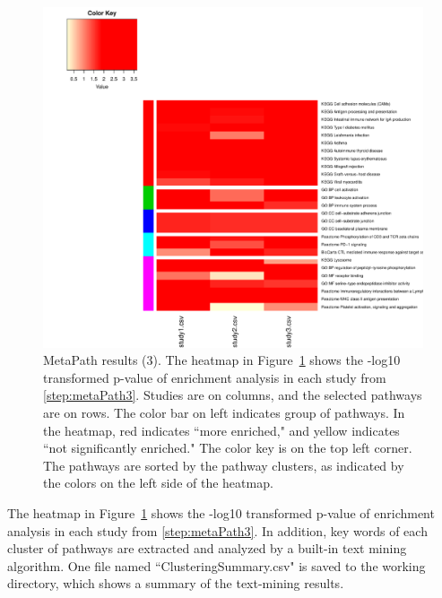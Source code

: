 \begin{figure}[H]
\begin{center}
\includegraphics[scale=0.6]{./figure/metaPath/Heatmap_clusters_all.pdf}
\caption{MetaPath results (3).
The heatmap in Figure~\ref{fig:MetaPathresult3} shows the -log10 transformed p-value of enrichment analysis in each study from \ref{step:metaPath3}. 
Studies are on columns, 
and the selected pathways are on rows. 
The color bar on left indicates group of pathways.
In the heatmap, red indicates ``more enriched," 
and yellow  indicates ``not significantly enriched." 
The color key is on the top left corner. 
The pathways are sorted by the pathway clusters, 
as indicated by the colors on the left side of the heatmap.}
\label{fig:MetaPathresult3}
\end{center}
\end{figure}


The heatmap in Figure~\ref{fig:MetaPathresult3} shows the -log10 transformed p-value of enrichment analysis in each study from \ref{step:metaPath3}. 
In addition, 
key words of each cluster of pathways are extracted and analyzed by a built-in text mining algorithm. 
One file named ``Clustering\textunderscore Summary.csv" is saved to the working directory, 
which shows a summary of the text-mining results. 


